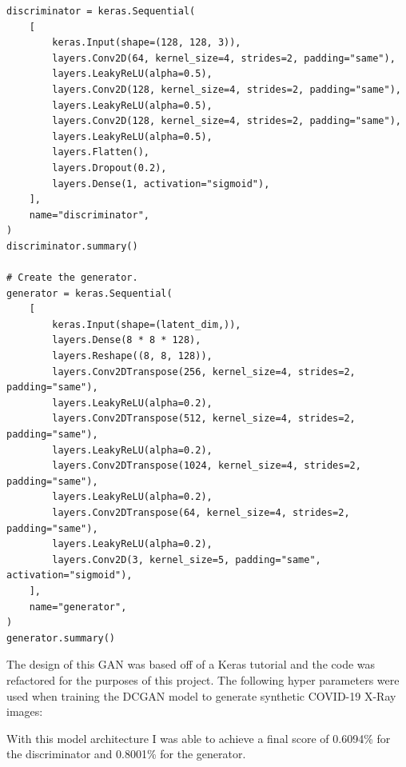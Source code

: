 \begin{verbatim}
discriminator = keras.Sequential(
    [
        keras.Input(shape=(128, 128, 3)),
        layers.Conv2D(64, kernel_size=4, strides=2, padding="same"),
        layers.LeakyReLU(alpha=0.5),
        layers.Conv2D(128, kernel_size=4, strides=2, padding="same"),
        layers.LeakyReLU(alpha=0.5),
        layers.Conv2D(128, kernel_size=4, strides=2, padding="same"),
        layers.LeakyReLU(alpha=0.5),
        layers.Flatten(),
        layers.Dropout(0.2),
        layers.Dense(1, activation="sigmoid"),
    ],
    name="discriminator",
)
discriminator.summary()

# Create the generator.
generator = keras.Sequential(
    [
        keras.Input(shape=(latent_dim,)),
        layers.Dense(8 * 8 * 128),
        layers.Reshape((8, 8, 128)),
        layers.Conv2DTranspose(256, kernel_size=4, strides=2, padding="same"),
        layers.LeakyReLU(alpha=0.2),
        layers.Conv2DTranspose(512, kernel_size=4, strides=2, padding="same"),
        layers.LeakyReLU(alpha=0.2),
        layers.Conv2DTranspose(1024, kernel_size=4, strides=2, padding="same"),
        layers.LeakyReLU(alpha=0.2),
        layers.Conv2DTranspose(64, kernel_size=4, strides=2, padding="same"),
        layers.LeakyReLU(alpha=0.2),
        layers.Conv2D(3, kernel_size=5, padding="same", activation="sigmoid"),
    ],
    name="generator",
)
generator.summary()
\end{verbatim}
The design of this GAN was based off of a Keras tutorial and the code was refactored for the purposes of this project\cite{DCGANKerasTutorial}.  The following hyper parameters were used when training the DCGAN model to generate synthetic COVID-19 X-Ray images: 
\begin{table}[H]
    \centering
    \caption{DCGAN for Producing Synthetic Data From Radiography Dataset }
    \label{tab:DCGAN for Producing Synthetic Data From Radiography Dataset}
\end{table}
With this model architecture I was able to achieve a final score of 0.6094\% for the discriminator and 0.8001\% for the generator.
